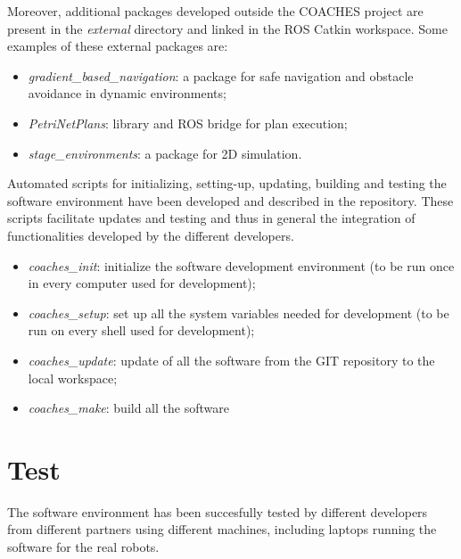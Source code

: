 \documentclass{article}
\begin{document}
Moreover, additional packages developed outside the COACHES project are present in the \emph{external} directory and linked in the ROS Catkin workspace.
Some examples of these external packages are:
\begin{itemize}
\item \emph{gradient\_based\_navigation}: a package for safe navigation and obstacle avoidance in dynamic environments;
\item \emph{PetriNetPlans}: library and ROS bridge for plan execution;
\item \emph{stage\_environments}: a package for 2D simulation.
\end{itemize}

Automated scripts for initializing, setting-up, updating, building and testing the software environment have been developed and described in the repository. These scripts facilitate updates and testing and thus in  general the integration of functionalities developed by the different developers.

\begin{itemize}
\item \emph{coaches\_init}: initialize the software development environment (to be run once in every computer used for development);
\item \emph{coaches\_setup}:   set up all the system variables needed for development (to be run on every shell used for development);
\item \emph{coaches\_update}:  update of all the software from the GIT repository to the local workspace;
\item \emph{coaches\_make}:   build all the software
\end{itemize}

\section{Test}

The software environment has been succesfully tested by different developers from different partners using different machines, including laptops running the software for the real robots.
\end{document}
